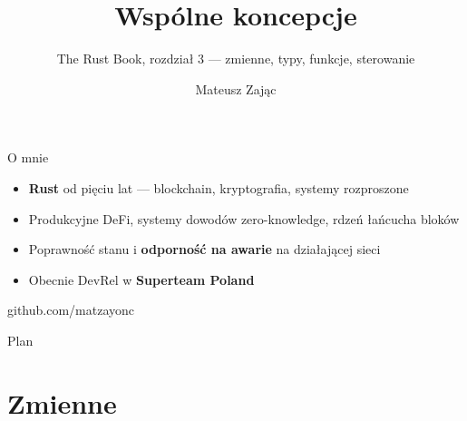 

\usepackage[utf8]{inputenc}
\usepackage[T1]{fontenc}
\usepackage{qrcode}

\newcommand{\stplqr}[3]{%
  \begin{minipage}[t]{0.44\textwidth}
    \centering
    \colorbox{white}{\color{black}\qrcode[height=2cm, padding]{#1}}\\[0.2cm]
    {\small\textbf{#2}}\\[0.05cm]
    \textcolor{stplmuted}{\tiny #3}
  \end{minipage}%
}


\title{Wspólne koncepcje}
\subtitle{The Rust Book, rozdział 3 --- zmienne, typy, funkcje, sterowanie}
\author{Mateusz Zając}



\maketitleframe

\begin{frame}{O mnie}
  \begin{itemize}
    \item \textbf{Rust} od pięciu lat --- blockchain, kryptografia, systemy rozproszone
    \item Produkcyjne DeFi, systemy dowodów zero-knowledge, rdzeń łańcucha bloków
    \item Poprawność stanu i \textbf{odporność na awarie} na działającej sieci
    \item Obecnie DevRel w \textbf{Superteam Poland}
  \end{itemize}
  \vspace{0.35cm}
  \begin{center}
    \textcolor{stplmuted}{\small github.com/matzayonc}
  \end{center}
\end{frame}

\begin{frame}{Plan}
  \tableofcontents
\end{frame}

\section{Zmienne}

